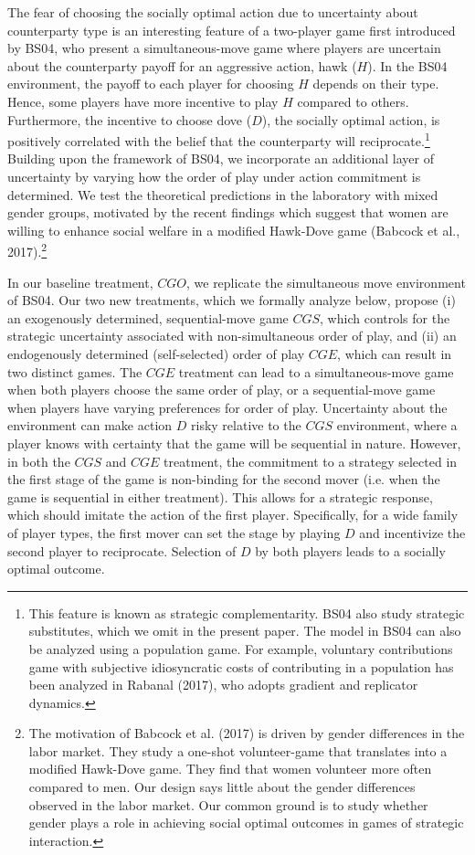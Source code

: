 \documentclass[11pt, letterpaper]{article}
\theoremstyle{plain}
\begin{document}
The fear of choosing the socially optimal action due to uncertainty about counterparty type is an interesting feature of a two-player game first introduced by BS04, who present a simultaneous-move game where players are uncertain about the counterparty payoff for an aggressive action, hawk ($H$). In the BS04 environment, the payoff to each player for choosing $H$ depends on their type. Hence, some players have more incentive to play $H$ compared to others. Furthermore, the incentive to choose dove ($D$), the socially optimal action, is positively correlated with the belief that the counterparty will reciprocate.\footnote{This feature is known as strategic complementarity. BS04 also study strategic substitutes, which we omit in the present paper. The model in BS04 can also be analyzed using a population game. For example, voluntary contributions game with subjective idiosyncratic costs of contributing in a population has been analyzed in Rabanal (2017), who adopts gradient and replicator dynamics.} Building upon the framework of BS04, we incorporate an additional layer of uncertainty by varying how the order of play under action commitment is determined. We test the theoretical predictions in the laboratory with mixed gender groups, motivated by the recent findings which suggest that women are willing to enhance social welfare in a modified Hawk-Dove game (Babcock et al., 2017).\footnote{The motivation of Babcock et al. (2017) is driven by gender differences in the labor market. They study a one-shot volunteer-game that translates into a modified Hawk-Dove game. They find that women volunteer more often compared to men. Our design says little about the gender differences observed in the labor market. Our common ground is to study whether gender plays a role in achieving social optimal outcomes in games of strategic interaction.}


In our baseline treatment, $CGO$, we replicate the simultaneous move environment of BS04. Our two new treatments, which we formally analyze below, propose (i) an exogenously determined, sequential-move game $CGS$, which controls for the strategic uncertainty associated with non-simultaneous order of play, and (ii) an endogenously determined (self-selected) order of play $CGE$, which can result in two distinct games. The $CGE$ treatment can lead to a simultaneous-move game when both players choose the same order of play, or a sequential-move game when players have varying preferences for order of play. Uncertainty about the environment can make action $D$ risky relative to the $CGS$ environment, where a player knows with certainty that the game will be sequential in nature. However, in both the $CGS$ and $CGE$ treatment, the commitment to a strategy selected in the first stage of the game is non-binding for the second mover (i.e. when the game is sequential in either treatment). This allows for a strategic response, which should imitate the action of the first player. Specifically, for a wide family of player types, the first mover can set the stage by playing $D$ and incentivize the second player to reciprocate. Selection of $D$ by both players leads to a socially optimal outcome.
\end{document}
